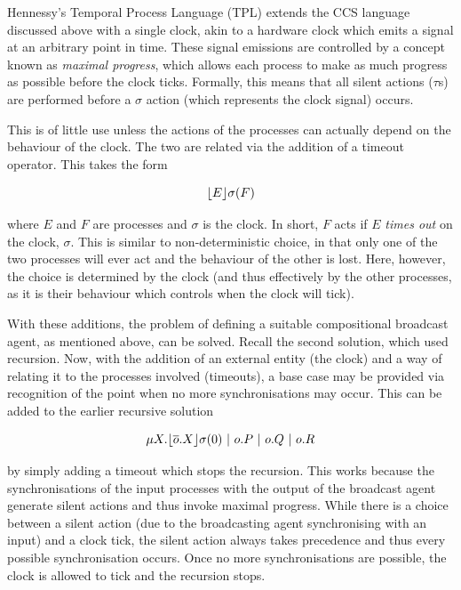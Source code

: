 Hennessy's Temporal Process Language (TPL) \cite{hennessy:tpl} extends
the CCS language discussed above with a single clock, akin to a
hardware clock which emits a signal at an arbitrary point in time.
These signal emissions are controlled by a concept known as
\emph{maximal progress}, which allows each process to make as much
progress as possible before the clock ticks.  Formally, this means
that all silent actions ($\tau$s) are performed before a $\sigma$
action (which represents the clock signal) occurs.

This is of little use unless the actions of the processes can actually
depend on the behaviour of the clock.  The two are related via the
addition of a timeout operator.  This takes the form

\begin{equation}
\lfloor{E}\rfloor {\sigma} ({F})
\end{equation}

\noindent where $E$ and $F$ are processes and $\sigma$ is the clock.  In
short, $F$ acts if $E$ \emph{times out} on the clock, $\sigma$.  This is
similar to non-deterministic choice, in that only one of the two
processes will ever act and the behaviour of the other is lost.  Here,
however, the choice is determined by the clock (and thus effectively by
the other processes, as it is their behaviour which controls when the
clock will tick).

With these additions, the problem of defining a suitable compositional
broadcast agent, as mentioned above, can be solved.  Recall the second
solution, which used recursion.  Now, with the addition of an external
entity (the clock) and a way of relating it to the processes involved
(timeouts), a base case may be provided via recognition of the point
when no more synchronisations may occur.  This can be added to the
earlier recursive solution

\begin{equation}
\mu X.\timeout{\overline{o}.X}{\sigma}{0}\ |\ o.P\ |\ o.Q\ |\ o.R
\end{equation}

\noindent by simply adding a timeout which stops the recursion.  This
works because the synchronisations of the input processes with the
output of the broadcast agent generate silent actions and thus invoke
maximal progress.  While there is a choice between a silent action
(due to the broadcasting agent synchronising with an input) and a
clock tick, the silent action always takes precedence and thus every
possible synchronisation occurs.  Once no more synchronisations are
possible, the clock is allowed to tick and the recursion stops.

